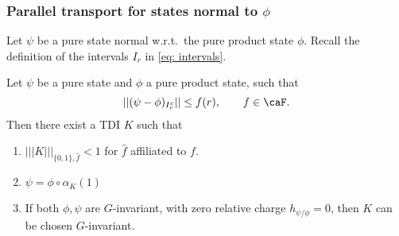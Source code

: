 \subsubsection{Parallel transport for states normal to $\phi$}
Let $\psi$ be a pure state normal w.r.t.\ the pure product state $\phi$.
Recall the definition of the intervals $I_r$ in \eqref{eq: intervals}. 
\begin{lemma}\label{lem: parallel transport}
	Let $\psi$ be a  pure state and $\phi$ a pure product state, such that
	\begin{equation}\label{eq: one-sided bounds repeat}
	|| (\psi-\phi)_{I_r^c} || \leq f(r),\qquad f \in \caF.
	\end{equation}
	Then there exist a  TDI $K$ such that 
	\begin{enumerate}
		\item   $|||K|||_{\{0,1\},\hat{f}} <1$ for $\hat{f}$ affiliated to $f$.  
		\item $\psi = \phi\circ \alpha_K(1)$
		\item  If both $\phi,\psi$ are $G$-invariant, with zero relative charge $h_{\psi/\phi}=0$, then $K$ can be chosen $G$-invariant.
	\end{enumerate}
\end{lemma}
